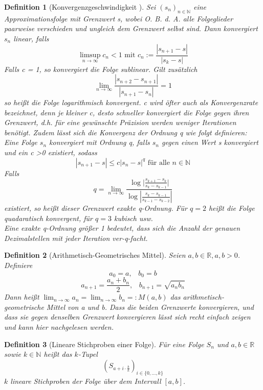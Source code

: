 \documentclass{scrartcl}
\newtheorem{definition}{Definition}
\theoremstyle{definition}
\newtheorem{approximation sequence}{Annäherungsfolge}
\begin{document}
\begin{definition}[Konvergenzgeschwindigkeit \cite{Konvergenzgeschwindigkeit}]
    Sei \((s_n)_{n \in \mathbb{N}}\) eine Approximationsfolge mit Grenzwert s,
    wobei O. B. d. A. alle Folgeglieder paarweise verschieden und ungleich dem
    Grenzwert selbst sind. Dann konvergiert \(s_n\) linear, falls
    \[\limsup_{n \to \infty} c_n < 1 \text{ mit } c_n := \frac{|s_{n+1}-s|}{|s_k-s|} \]
    Falls c = 1, so konvergiert die Folge sublinear. Gilt zusätzlich
    \[\lim_{n \to \infty} \frac{|s_{n+2}-s_{n+1}|}{|s_{n+1}-s_n|} = 1\]
    so heißt die Folge logarithmisch konvergent. c wird öfter auch als
    Konvergenzrate bezeichnet, denn je kleiner c, desto schneller konvergiert
    die Folge gegen ihren Grenzwert, d.h. für eine gewünschte Präzision werden
    weniger Iterationen benötigt. Zudem lässt sich die Konvergenz der Ordnung q
    wie folgt definieren: Eine Folge \(s_n\) konvergiert mit Ordnung q, falls
    \(s_n\) gegen einen Wert s konvergiert und ein c \textgreater 0 existiert,
    sodass
    \[|s_{n+1} - s| \leqslant c|s_n - s|^q \text{ für alle } n \in \mathbb{N}\]
    Falls
    \[q = \lim_{n \to \infty} \frac{\log|{\frac{s_{k+1} - s_k}{s_k - s_{k-1}}|}}{\log{|\frac{s_k - s_{k-1}}{s_{k-1} - s_{k-2}}|}} \]
    existiert, so heißt dieser Grenzwert exakte q-Ordnung. Für \(q = 2\) heißt
    die Folge quadaratisch konvergent, für \(q = 3 \) kubisch usw. \\ Eine
    exakte q-Ordnung größer 1 bedeutet, dass sich die Anzahl der genauen
    Dezimalstellen mit jeder Iteration ver-q-facht.
\end{definition}

\begin{definition}[Arithmetisch-Geometrisches Mittel]
    Seien \(a, b \in \mathbb{R}, a,b > 0\). Definiere
    \[a_0 = a, \;\;\; b_0 = b\]
    \[a_{n+1} = \frac{a_n + b_n}{2}, \;\;\; b_{n+1} = \sqrt{a_n b_n}\]
    Dann heißt \(\lim_{n \to \infty}a_n = \lim_{n \to \infty} b_n =: M(a,b) \)
    das arithmetisch-geometrische Mittel von a und b. Dass die beiden
    Grenzwerte konvergieren, und dass sie gegen denselben Grenzwert
    konvergieren lässt sich recht einfach zeigen und kann hier \cite{AGM}
    nachgelesen werden.
\end{definition}

\begin{definition}[Lineare Stichproben einer Folge]
    Für eine Folge \(S_n\) und \(a, b \in \mathbb{R}\) sowie \(k \in
    \mathbb{N}\) heißt das \(k\)-Tupel
    \begin{equation}
        \left(S_{a + i \cdot \frac{b}{k}}\right)_{i \in \{0, \ldots, k\}}
    \end{equation}
    \(k\) lineare Stichproben der Folge über dem Intervall \([a, b]\).
\end{definition}
\end{document}
